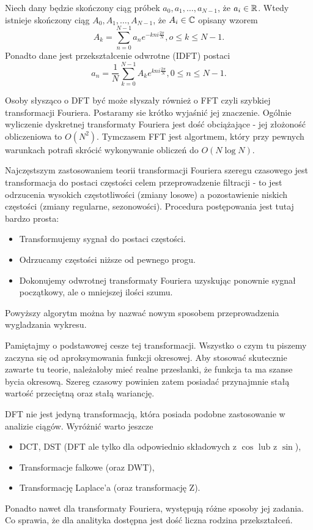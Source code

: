 \documentclass[10pt,a4paper]{book}
\begin{document}
\begin{definition}[DFT]
Niech dany będzie skończony ciąg próbek $a_0, a_1, \ldots, a_{N-1}$, że $a_i \in \mathbb{R} $. Wtedy istnieje skończony ciąg $A_0, A_1, \ldots, A_{N-1}$, że $A_i \in \mathbb{C} $ opisany wzorem
$$
A_k = \sum_{n=0}^{N-1} a_n e^{-kn i \frac{2\pi}{N}}, o \leq k \leq N-1.
$$
Ponadto dane jest przekształcenie odwrotne (IDFT) postaci
$$
a_n = \frac{1}{N} \sum_{k=0}^{N-1} A_k e^{kn i \frac{2\pi}{N}}, 0 \leq n \leq N-1.
$$
\end{definition}

Osoby słysząco o DFT być może słyszały również o FFT czyli szybkiej transformacji Fouriera. Postaramy sie krótko wyjaśnić jej znaczenie. Ogólnie wyliczenie dyskretnej transformaty Fouriera jest dość obciążające - jej złożoność obliczeniowa to $O(N^2)$. Tymczasem FFT jest algortmem, który przy pewnych warunkach potrafi skrócić wykonywanie obliczeń do $O(N \log N)$.

Najczęstszym zastosowaniem teorii transformacji Fouriera szeregu czasowego jest transformacja do postaci częstości celem przeprowadzenie filtracji - to jest odrzucenia wysokich częstotliwości (zmiany losowe) a pozostawienie niskich częstości (zmiany regularne, sezonowości). Procedura postępowania jest tutaj bardzo prosta:

\begin{itemize}
\item Transformujemy sygnał do postaci częstości.
\item Odrzucamy częstości niższe od pewnego progu.
\item Dokonujemy odwrotnej transformaty Fouriera uzyskując ponownie sygnał początkowy, ale o mniejszej ilości szumu.
\end{itemize}

Powyższy algorytm można by nazwać nowym sposobem przeprowadzenia wygladzania wykresu.

\begin{remark*}
Pamiętajmy o podstawowej cesze tej transformacji. Wszystko o czym tu piszemy zaczyna się od aproksymowania funkcji okresowej. Aby stosować skutecznie zawarte tu teorie, należałoby mieć realne przesłanki, że funkcja ta ma szanse bycia okresową. Szereg czasowy powinien zatem posiadać przynajmnie stałą wartość przeciętną oraz stałą wariancję.
\end{remark*} 

\begin{remark*}
DFT nie jest jedyną transformacją, która posiada podobne zastosowanie w analizie ciągów. Wyróżnić warto jeszcze
\begin{itemize}
\item DCT, DST (DFT ale tylko dla odpowiednio składowych z $\cos$ lub z $\sin$),
\item Transformacje falkowe (oraz DWT),
\item Transformację Laplace'a (oraz transformację Z).
\end{itemize}
Ponadto nawet dla transformaty Fouriera, występują różne sposoby jej zadania. Co sprawia, że dla analityka dostępna jest dość liczna rodzina przekształceń.
\end{remark*}
\end{document}
